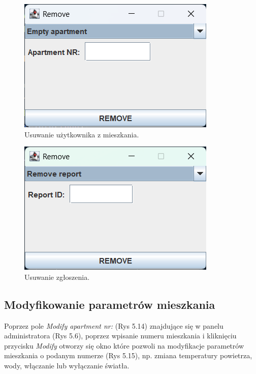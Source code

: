 \begin{figure}[H]
    \centering
    \includegraphics[width=\textwidth,height=0.15\textheight,keepaspectratio]{figures/app-images/Remove/empty-apartment.png}
    \caption{Usuwanie użytkownika z mieszkania.\label{fig17}}
\end{figure}

\begin{figure}[H]
    \centering
    \includegraphics[width=\textwidth,height=0.15\textheight,keepaspectratio]{figures/app-images/Remove/remove-report.png}
    \caption{Usuwanie zgłoszenia.\label{fig18}}
\end{figure}

\newpage
\subsection{Modyfikowanie parametrów mieszkania}
Poprzez pole \textit{Modify apartment nr:} (Rys 5.14) znajdujące się w panelu administratora (Rys 5.6), poprzez wpisanie numeru mieszkania 
i kliknięciu przycisku \textit{Modify} otworzy się okno które pozwoli na modyfikacje parametrów mieszkania o podanym numerze (Rys 5.15),
np. zmiana temperatury powietrza, wody, włączanie lub wyłączanie światła.

